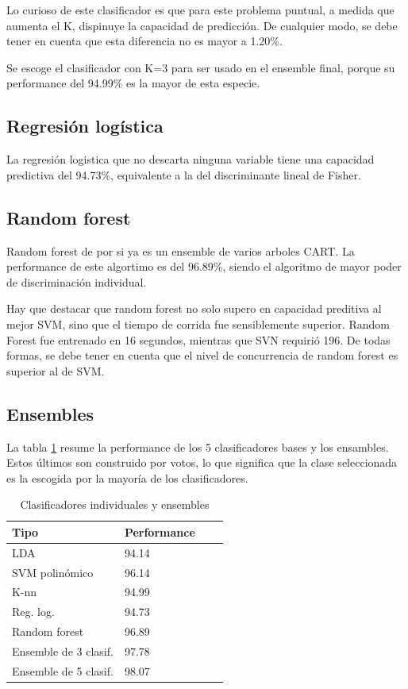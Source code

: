 \documentclass[journal]{IEEEtran}
\begin{document}
Lo curioso de este clasificador es que para este problema puntual, a medida
que aumenta el K, dispinuye la capacidad de predicción. De cualquier modo,
se debe tener en cuenta que esta diferencia no es mayor a 1.20\%.

Se escoge el clasificador con K=3 para ser usado en el ensemble final,
porque su performance del 94.99\% es la mayor de esta especie.

\subsection{Regresión logística}
La regresión logistica que no descarta ninguna variable tiene 
una capacidad predictiva del 94.73\%, equivalente a la del
discriminante lineal de Fisher.

\subsection{Random forest}
Random forest de por si ya es un ensemble de varios arboles
CART. La performance de este algortimo es del 96.89\%,
siendo el algoritmo de mayor poder de discriminación  individual. 

Hay que destacar que random forest no solo supero en capacidad preditiva
al mejor SVM, sino que el tiempo de corrida fue sensiblemente superior.
Random Forest fue entrenado en 16 segundos, mientras que SVN requirió
196. De todas formas, se debe tener en cuenta que el nivel de
concurrencia de random forest es superior al de SVM.

\subsection{Ensembles}
La tabla \ref{table:ensemble_summary} resume la performance
de los 5 clasificadores bases y los ensambles. 
Estos últimos son construido por votos, lo que
significa que la clase seleccionada es la escogida por la mayoría 
de los clasificadores.

\begin{table}[ht!]
\caption{Clasificadores individuales y ensembles}
\label{table:ensemble_summary}
\centering
\begin{tabular}{l | l l l }
Tipo & Performance  \\
\hline
LDA & 94.14 \\
SVM polinómico & 96.14 \\
K-nn & 94.99 \\
Reg. log. & 94.73 \\
Random forest & 96.89 \\
\hline
Ensemble de 3 clasif. & 97.78 \\
Ensemble de 5 clasif. & 98.07 \\
\end{tabular}
\end{table}
\end{document}
